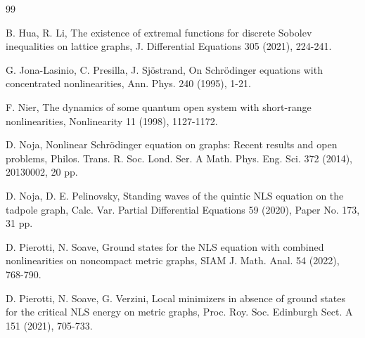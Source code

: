 \documentclass[11pt]{amsart}
\numberwithin{equation}{section}
\begin{document}
\begin{thebibliography}{99}


    B. Hua, R. Li,
    The existence of extremal functions for discrete Sobolev inequalities on lattice graphs,
    J. Differential Equations 305 (2021), 224-241.


G. Jona-Lasinio, C. Presilla, J. Sj\"ostrand, On Schr\"odinger equations with concentrated nonlinearities, Ann. Phys. 240 (1995), 1-21.




F. Nier, The dynamics of some quantum open system with short-range nonlinearities, Nonlinearity 11 (1998), 1127-1172.

D. Noja, Nonlinear Schr\"{o}dinger equation on graphs: Recent results and open problems, Philos. Trans. R. Soc. Lond. Ser. A Math. Phys. Eng. Sci. 372 (2014), 20130002, 20 pp.

D. Noja, D. E. Pelinovsky, Standing waves of the quintic NLS equation on the tadpole graph, Calc. Var. Partial Differential Equations 59 (2020), Paper No. 173, 31 pp.

D. Pierotti, N. Soave, Ground states for the NLS equation with combined nonlinearities on noncompact metric graphs, SIAM J. Math. Anal. 54 (2022), 768-790.

D. Pierotti, N. Soave, G. Verzini, Local minimizers in absence of ground states for the critical NLS energy on metric graphs, Proc. Roy. Soc. Edinburgh Sect. A 151 (2021), 705-733.


\end{thebibliography}
\end{document}

